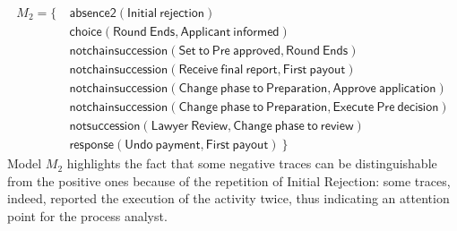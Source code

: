 {\small{\begin{align*}
M_2 = \{ \ &  \mathsf{ absence2(Initial\ rejection)} \\
& \mathsf{ choice(Round\ Ends, Applicant\ informed)} \\
& \mathsf{ notchainsuccession(Set\ to\ Pre\ approved, Round\ Ends)} \\
& \mathsf{ notchainsuccession(Receive\ final\ report, First\ payout)} \\
& \mathsf{ notchainsuccession(Change\ phase\ to\ Preparation, Approve\ application)} \\
& \mathsf{ notchainsuccession(Change\ phase\ to\ Preparation, Execute\ Pre\ decision)} \\
& \mathsf{ notsuccession(Lawyer\ Review, Change\ phase\ to\ review)} \\
& \mathsf{ response(Undo\ payment, First\ payout) } \ \} 
\end{align*}
}
}
Model $M_2$ %
highlights the fact that some negative traces can be distinguishable from the positive ones because of the repetition of \textsf{Initial Rejection}: some traces, indeed, reported the execution of the activity twice, thus indicating an attention point for the process analyst.


